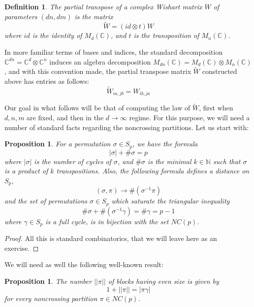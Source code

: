 \documentclass[12pt]{amsbook}
\newtheorem{definition}[theorem]{Definition}
\newtheorem{proposition}[theorem]{Proposition}
\begin{document}
\begin{definition}
The partial transpose of a complex Wishart matrix $W$ of parameters $(dn,dm)$ is the matrix
$$\tilde{W}=(id\otimes t)W$$
where $id$ is the identity of $M_d(\mathbb C)$, and $t$ is the transposition of $M_n(\mathbb C)$. 
\end{definition}

In more familiar terms of bases and indices, the standard decomposition $\mathbb C^{dn}=\mathbb C^d\otimes\mathbb C^n$ induces an algebra decomposition $M_{dn}(\mathbb C)=M_d(\mathbb C)\otimes M_n(\mathbb C)$, and with this convention made, the partial transpose matrix $\tilde{W}$ constructed above has entries as follows:
$$\tilde{W}_{ia,jb}=W_{ib,ja}$$

Our goal in what follows will be that of computing the law of $\tilde{W}$, first when $d,n,m$ are fixed, and then in the $d\to\infty$ regime. For this purpose, we will need a number of standard facts regarding the noncrossing partitions. Let us start with:

\begin{proposition}
For a permutation $\sigma\in S_p$, we have the formula
$$|\sigma|+\#\sigma=p$$
where $|\sigma|$ is the number of cycles of $\sigma$, and $\#\sigma$ is the minimal $k\in\mathbb N$ such that $\sigma$ is a product of $k$ transpositions. Also, the following formula defines a distance on $S_p$, 
$$(\sigma,\pi)\to\#(\sigma^{-1}\pi)$$
and the set of permutations $\sigma\in S_p$ which saturate the triangular inequality 
$$\#\sigma+\#(\sigma^{-1}\gamma)=\#\gamma=p-1$$
where $\gamma\in S_p$ is a full cycle, is in bijection with the set $NC(p)$. 
\end{proposition}

\begin{proof}
All this is standard combinatorics, that we will leave here as an exercise.
\end{proof}

We will need as well the following well-known result:

\begin{proposition}
The number $||\pi||$ of blocks having even size is given by
$$1+||\pi||=|\pi\gamma|$$
for every noncrossing partition $\pi \in NC(p)$.
\end{proposition}
\end{document}
